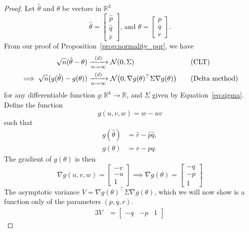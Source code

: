 \documentclass[letterpaper, oneside, reqno]{amsart}
\numberwithin{equation}{section}
\newcommand{\T}{\top} %
\newcommand{\R}{\mathbb{R}}  %
\newcommand{\N}[2]{\mathcal{N}\mleft( #1, #2 \mright)}
\newcommand{\by}[1]{&\quad&\text{(#1)}}
\newcommand{\Dlim}{\xrightarrow[n \to \infty]{(d)}}
\newcommand{\phat}{\hat{p}}
\newcommand{\qhat}{\hat{q}}
\newcommand{\rhat}{\hat{r}}
\begin{document}
\begin{proof}
  Let $\hat{\theta}$ and $\theta$ be vectors in $\R^3$
  \begin{equation*}
    \hat{\theta} = \begin{bmatrix} \phat \\ \qhat \\ \rhat \end{bmatrix} \text{, and } 
    \theta = \begin{bmatrix} p \\ q \\ r \end{bmatrix}.
  \end{equation*}
  From our proof of Proposition~\ref{prop:normality_pqr}, we have
  \begin{alignat*}{3}
    \sqrt{n}(\hat{\theta} - \theta) &\Dlim \N{0}{\Sigma} \by{CLT} \\
    \implies \sqrt{n}(g(\hat{\theta}) - g(\theta)) &\Dlim \N{0}{\nabla g(\theta)^\T \Sigma
      \nabla g(\theta)} \by{Delta method}
  \end{alignat*}
  for any differentiable function $g \colon \R^k \to \R$, and $\Sigma$ given by
  Equation~\eqref{eq:sigma}. 
  Define the function 
  \begin{equation} \label{eq:g}
    g(u, v, w) = w - uv
  \end{equation}
  such that 
  \begin{align*}
    g(\hat{\theta}) &= \rhat - \phat\qhat, \\
    g(\theta) &= r - pq.
  \end{align*}
  The gradient of $g(\theta)$ is then
  \begin{equation}
    \nabla g(u,v,w) = \begin{bmatrix} -v \\ -u \\ 1 \end{bmatrix} 
    \implies \nabla g(\theta) = \begin{bmatrix} -q \\ -p \\ 1 \end{bmatrix}
  \end{equation}
  The asymptotic variance $V = \nabla g(\theta)^\T \Sigma \nabla g(\theta)$,
  which we will now show is a function only of the parameters $(p, q, r)$.
  \begin{alignat*}{3}
    V &= \begin{bmatrix} -q & -p & 1 \end{bmatrix} 

\end{alignat*}
\end{proof}
\end{document}
